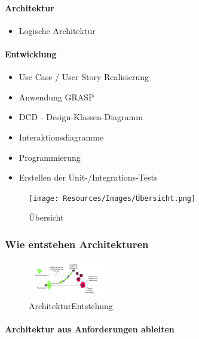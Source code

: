 \documentclass[../ZF_SWEN1.tex]{subfiles}
\begin{document}
\paragraph{Architektur}
\begin{itemize}
	\item Logische Architektur
\end{itemize}

\paragraph{Entwicklung}
\begin{itemize}
	\item Use Case / User Story Realisierung
	\item Anwendung GRASP
	\item DCD - Design-Klassen-Diagramm
	\item Interaktionsdiagramme
	\item Programmierung
	\item Erstellen der Unit-/Integrations-Tests
\end{itemize}

\begin{figure}[H]
\centering				\texttt{[image: Resources/Images/Übersicht.png]}
\caption{\label{fig:Übersicht}Übersicht}
\end{figure} 


\subsubsection{Wie entstehen Architekturen}

\begin{figure}[H]
\centering				\includegraphics[width=0.3\textwidth] {Resources/Images/ArchitekturEntstehung.png}
\caption{\label{fig:ArchitekturEntstehung}ArchitekturEntstehung}
\end{figure} 

\paragraph{Architektur aus Anforderungen ableiten}
\end{document}
